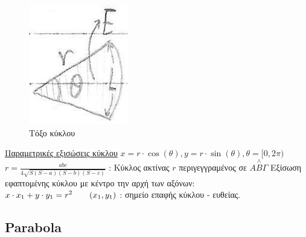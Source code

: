 \documentclass[12pt]{article}
\begin{document}
\begin{flushleft}
	\begin{figure}[H]
	\centering
	\includegraphics[scale=2]{toxo}
	\caption{\textgreek{Τόξο κύκλου}}
	\label{fig:Toxo}
	\end{figure}
	
	\uline{\textgreek{Παραμετρικές εξισώσεις κύκλου}} \linebreak
	\textbullet \quad $\displaystyle x=r\cdot \cos (\theta), y = r\cdot \sin (\theta), \theta = [0, 2\pi) $ \linebreak 
	\textbullet \quad $\displaystyle r = \frac{abc}{4\sqrt{S(S-a)(S-b)(S-c)}} $ \textgreek{: Κύκλος ακτίνας} $r$ \textgreek{περιγεγγραμένος σε} $\displaystyle A\overset{\wedge}{B}\Gamma$ \linebreak 
	\textbullet \quad \textgreek{Εξίσωση εφαπτομένης κύκλου με κέντρο την αρχή των αξόνων: } $\displaystyle  x\cdot x_1 + y\cdot y_1 = r^2 \text{\qquad} (x_1, y_1) $ \textgreek{: σημείο επαφής κύκλου - ευθείας}. \linebreak 	
	
	\subsection{Parabola}
	

\end{flushleft}
\end{document}
